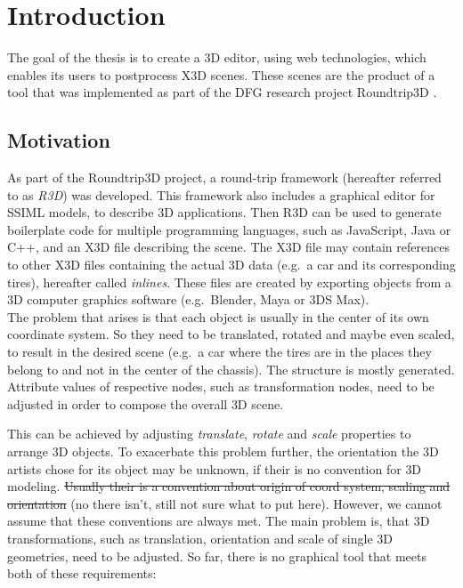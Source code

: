 
\section{Introduction}
\label{sec:Prelude}

The goal of the thesis is to create a \gls{3D} editor, using web technologies,
which enables its users to postprocess \gls{X3D} scenes. These scenes are the
product of a tool that was implemented as part of the DFG research
project \gls{Roundtrip3D} \cite{Jung:2015:SDA:2802768.2802837}.
\subsection{Motivation}\label{motivation}

As part of the Roundtrip3D project, a round-trip framework (hereafter
referred to as \emph{R3D}) was developed. This framework also includes a
graphical editor for SSIML models, to describe \gls{3D} applications. Then
\gls{R3D} can be used to generate boilerplate code for multiple programming
languages, such as JavaScript, Java or C++, and an \gls{X3D} file describing
the scene. The \gls{X3D} file may contain references to other \gls{X3D} files
containing the actual \gls{3D} data (e.g.~a car and its corresponding tires),
hereafter called \emph{inlines}. These files are created by exporting
objects from a \gls{3D} computer graphics software (e.g.~Blender,
Maya or 3DS Max).\\
The problem that arises is that each object is usually in the center of
its own coordinate system. So they need to be translated, rotated and
maybe even scaled, to result in the desired scene (e.g.~a car where the tires
are in the places they belong to and not in the center of the chassis).
The structure is mostly generated. Attribute values of respective nodes,
such as transformation nodes, need to be adjusted in order to compose the
overall \gls{3D} scene.


This can be achieved by adjusting \emph{translate}, \emph{rotate} and
\emph{scale} properties to arrange \gls{3D} objects. To exacerbate this problem
further, the orientation the \gls{3D} artists chose for its object may be unknown, if
their is no convention for \gls{3D} modeling. \sout{Usually their is a convention
about origin of coord system, scaling and orientation} (no there isn't, still
not sure what to put here). However, we cannot assume that these conventions are
always met. The main problem is, that \gls{3D} transformations, such as translation,
orientation and scale of single \gls{3D} geometries, need to be adjusted. So far,
there is no graphical tool that meets both of these requirements:

